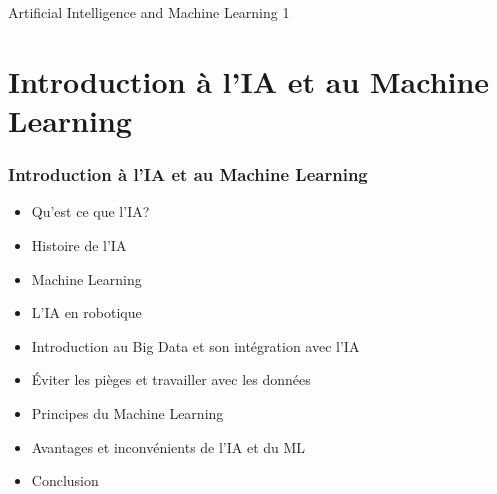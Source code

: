 \documentclass{beamer}
\begin{document}
{
\begin{frame}[plain]{Artificial Intelligence and Machine Learning 1}
\end{frame}
}	%

	\section{Introduction à l'IA et au Machine Learning}
\begin{frame}
	\frametitle{Introduction à l'IA et au Machine Learning}
	\begin{itemize}
		\item Qu'est ce que l'IA?
		\item Histoire de l'IA
		\item Machine Learning
		\item L'IA en robotique
		\item Introduction au Big Data et son intégration avec l'IA
		\item Éviter les pièges et travailler avec les données
		\item Principes du Machine Learning
		\item Avantages et inconvénients de l'IA et du ML
		\item Conclusion 
	\end{itemize}
\end{frame}
\end{document}
